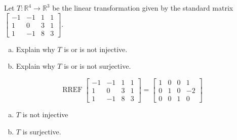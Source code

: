 
\begin{exerciseStatement}
 Let \(T:\mathbb{R}^ 4  \to \mathbb{R}^ 3 \) be the linear transformation given by the standard matrix \( \left[\begin{array}{cccc}
-1 & -1 & 1 & 1 \\
1 & 0 & 3 & 1 \\
1 & -1 & 8 & 3
\end{array}\right] .\)
\begin{enumerate}[(a)]
\item Explain why \(T\) is or is not injective.
\item Explain why \(T\) is or is not surjective.
\end{enumerate}
    
\end{exerciseStatement}
    
\begin{exerciseAnswer} 


\[\operatorname{RREF} \left[\begin{array}{cccc}
-1 & -1 & 1 & 1 \\
1 & 0 & 3 & 1 \\
1 & -1 & 8 & 3
\end{array}\right] = \left[\begin{array}{cccc}
1 & 0 & 0 & 1 \\
0 & 1 & 0 & -2 \\
0 & 0 & 1 & 0
\end{array}\right] \]


\begin{enumerate}[(a)]
\item \(T\) is not injective
\item \(T\) is surjective.
\end{enumerate}
    
\end{exerciseAnswer}
    
